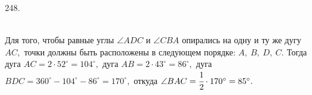 248. \begin{figure}[ht!]
\end{figure}\\
Для того, чтобы равные углы $\angle ADC$ и $\angle CBA$ опирались на одну и ту же дугу $AC,$ точки должны быть расположены в следующем порядке: $A,\ B,\ D,\ C.$ Тогда дуга $AC=2\cdot 52^\circ=104^\circ,$ дуга $AB=2\cdot43^\circ=86^\circ,$ дуга $BDC=360^\circ-104^\circ-86^\circ=170^\circ,$ откуда $\angle BAC=\cfrac{1}{2}\cdot 170^\circ=85^\circ.$\\
